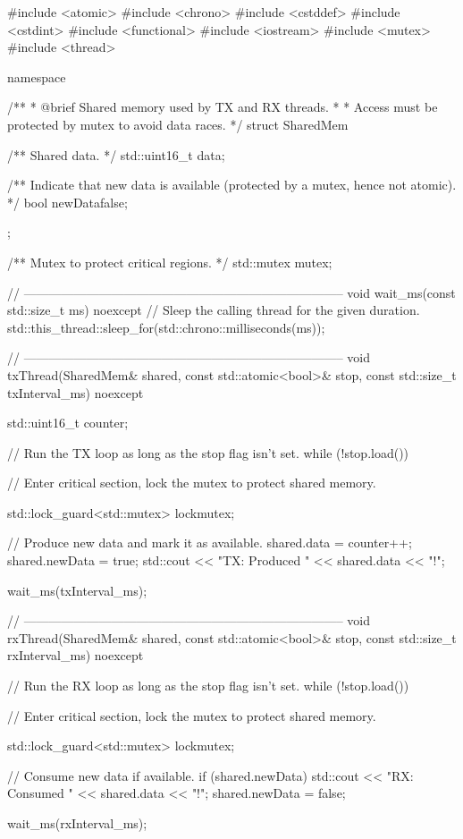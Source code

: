 \begin{cppcode}
#include <atomic>
#include <chrono>
#include <cstddef>
#include <cstdint>
#include <functional>
#include <iostream>
#include <mutex>
#include <thread>

namespace
{
/**
 * @brief Shared memory used by TX and RX threads.
 *
 *        Access must be protected by mutex to avoid data races.
 */
struct SharedMem
{
    /** Shared data. */
    std::uint16_t data{};

    /** Indicate that new data is available (protected by a mutex, hence not atomic). */
    bool newData{false};
};

/** Mutex to protect critical regions. */
std::mutex mutex{};

// -----------------------------------------------------------------------------
void wait_ms(const std::size_t ms) noexcept
{
    // Sleep the calling thread for the given duration.
    std::this_thread::sleep_for(std::chrono::milliseconds(ms));
}

// -----------------------------------------------------------------------------
void txThread(SharedMem& shared, const std::atomic<bool>& stop,
              const std::size_t txInterval_ms) noexcept
{
    std::uint16_t counter{};

    // Run the TX loop as long as the stop flag isn't set.
    while (!stop.load())
    {
        // Enter critical section, lock the mutex to protect shared memory.
        {
            std::lock_guard<std::mutex> lock{mutex};

            // Produce new data and mark it as available.
            shared.data    = counter++;
            shared.newData = true;
            std::cout << "TX: Produced " << shared.data << "!\n";
        }
        wait_ms(txInterval_ms);
    }
}

// -----------------------------------------------------------------------------
void rxThread(SharedMem& shared, const std::atomic<bool>& stop,
              const std::size_t rxInterval_ms) noexcept
{
    // Run the RX loop as long as the stop flag isn't set.
    while (!stop.load())
    {
        // Enter critical section, lock the mutex to protect shared memory.
        {
            std::lock_guard<std::mutex> lock{mutex};

            // Consume new data if available.
            if (shared.newData)
            {
                std::cout << "RX: Consumed " << shared.data << "!\n";
                shared.newData = false;
            }
        }
        wait_ms(rxInterval_ms);
    }
}

}
\end{cppcode}
